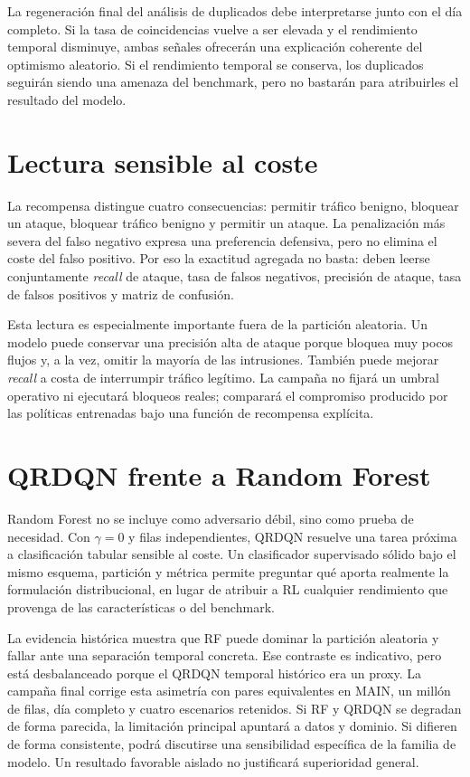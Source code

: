 La regeneración final del análisis de duplicados debe interpretarse junto con el día completo. Si la tasa de coincidencias vuelve a ser elevada y el rendimiento temporal disminuye, ambas señales ofrecerán una explicación coherente del optimismo aleatorio. Si el rendimiento temporal se conserva, los duplicados seguirán siendo una amenaza del benchmark, pero no bastarán para atribuirles el resultado del modelo.

\section{Lectura sensible al coste}

La recompensa distingue cuatro consecuencias: permitir tráfico benigno, bloquear un ataque, bloquear tráfico benigno y permitir un ataque. La penalización más severa del falso negativo expresa una preferencia defensiva, pero no elimina el coste del falso positivo. Por eso la exactitud agregada no basta: deben leerse conjuntamente \emph{recall} de ataque, tasa de falsos negativos, precisión de ataque, tasa de falsos positivos y matriz de confusión.

Esta lectura es especialmente importante fuera de la partición aleatoria. Un modelo puede conservar una precisión alta de ataque porque bloquea muy pocos flujos y, a la vez, omitir la mayoría de las intrusiones. También puede mejorar \emph{recall} a costa de interrumpir tráfico legítimo. La campaña no fijará un umbral operativo ni ejecutará bloqueos reales; comparará el compromiso producido por las políticas entrenadas bajo una función de recompensa explícita.

\section{QRDQN frente a Random Forest}

Random Forest no se incluye como adversario débil, sino como prueba de necesidad. Con $\gamma=0$ y filas independientes, QRDQN resuelve una tarea próxima a clasificación tabular sensible al coste. Un clasificador supervisado sólido bajo el mismo esquema, partición y métrica permite preguntar qué aporta realmente la formulación distribucional, en lugar de atribuir a RL cualquier rendimiento que provenga de las características o del benchmark.

La evidencia histórica muestra que RF puede dominar la partición aleatoria y fallar ante una separación temporal concreta. Ese contraste es indicativo, pero está desbalanceado porque el QRDQN temporal histórico era un proxy. La campaña final corrige esta asimetría con pares equivalentes en MAIN, un millón de filas, día completo y cuatro escenarios retenidos. Si RF y QRDQN se degradan de forma parecida, la limitación principal apuntará a datos y dominio. Si difieren de forma consistente, podrá discutirse una sensibilidad específica de la familia de modelo. Un resultado favorable aislado no justificará superioridad general.

